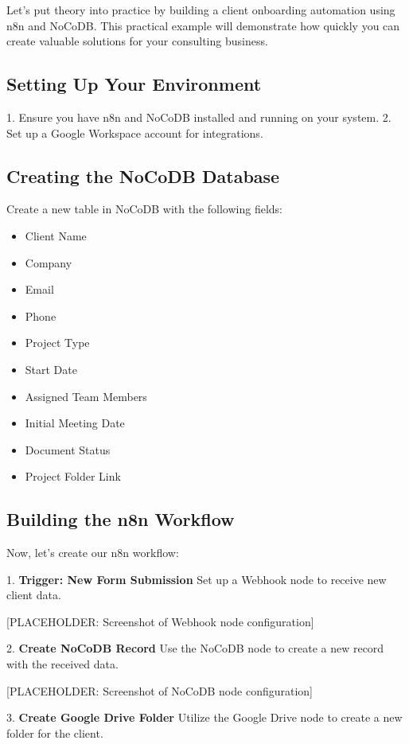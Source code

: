 Let's put theory into practice by building a client onboarding automation using n8n and NoCoDB. This practical example will demonstrate how quickly you can create valuable solutions for your consulting business.

\subsection{Setting Up Your Environment}

1. Ensure you have n8n and NoCoDB installed and running on your system.
2. Set up a Google Workspace account for integrations.

\subsection{Creating the NoCoDB Database}

Create a new table in NoCoDB with the following fields:
\begin{itemize}
    \item Client Name
    \item Company
    \item Email
    \item Phone
    \item Project Type
    \item Start Date
    \item Assigned Team Members
    \item Initial Meeting Date
    \item Document Status
    \item Project Folder Link
\end{itemize}

\subsection{Building the n8n Workflow}

Now, let's create our n8n workflow:

1. \textbf{Trigger: New Form Submission}
Set up a Webhook node to receive new client data.

[PLACEHOLDER: Screenshot of Webhook node configuration]

2. \textbf{Create NoCoDB Record}
Use the NoCoDB node to create a new record with the received data.

[PLACEHOLDER: Screenshot of NoCoDB node configuration]

3. \textbf{Create Google Drive Folder}
Utilize the Google Drive node to create a new folder for the client.

